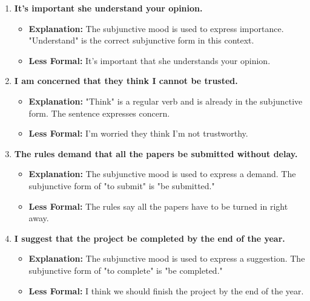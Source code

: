 \begin{enumerate}
\begin{itemize}
            \end{itemize}
      \item \textbf{It's important she understand your opinion.}
            \begin{itemize}
                  \item \textbf{Explanation:} The subjunctive mood is used to express importance. "Understand" is the correct subjunctive form in this context.
                  \item \textbf{Less Formal:} It's important that she understands your opinion.
            \end{itemize}
      \item \textbf{I am concerned that they think I cannot be trusted.}
            \begin{itemize}
                  \item \textbf{Explanation:} "Think" is a regular verb and is already in the subjunctive form. The sentence expresses concern.
                  \item \textbf{Less Formal:} I'm worried they think I'm not trustworthy.
            \end{itemize}
      \item \textbf{The rules demand that all the papers be submitted without delay.}
            \begin{itemize}
                  \item \textbf{Explanation:} The subjunctive mood is used to express a demand. The subjunctive form of "to submit" is "be submitted."
                  \item \textbf{Less Formal:} The rules say all the papers have to be turned in right away.
            \end{itemize}
      \item \textbf{I suggest that the project be completed by the end of the year.}
            \begin{itemize}
                  \item \textbf{Explanation:} The subjunctive mood is used to express a suggestion. The subjunctive form of "to complete" is "be completed."
                  \item \textbf{Less Formal:} I think we should finish the project by the end of the year.
            \end{itemize}
\end{enumerate}

